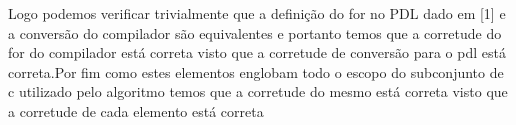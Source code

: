 \documentclass{article}
\begin{document}
		
		Logo podemos verificar trivialmente que a definição do for no PDL dado em [1] e a conversão do compilador são equivalentes e portanto temos que a corretude do for do compilador está correta visto que a corretude de conversão para o pdl está correta.Por fim como estes elementos englobam todo o escopo do subconjunto de c utilizado pelo algoritmo temos que a corretude do mesmo está correta visto que a corretude de cada elemento está correta
		
		
		
\end{document}
